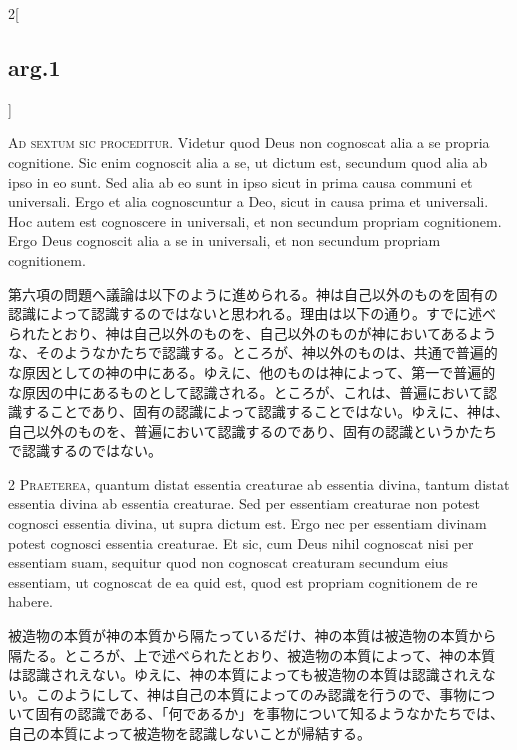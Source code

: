 \documentclass[paper=a4paper,fontsize=10pt,jafontsize=9pt,titlepage]{jlreq}
\begin{document}
\begin{paracol}{2}[\subsection{arg.1}]

{\huge A}{\scshape d sextum sic proceditur}. Videtur quod Deus non
cognoscat alia a se propria cognitione. Sic enim cognoscit alia a se,
ut dictum est, secundum quod alia ab ipso in eo sunt. Sed alia ab eo
sunt in ipso sicut in prima causa communi et universali. Ergo et alia
cognoscuntur a Deo, sicut in causa prima et universali. Hoc autem est
cognoscere in universali, et non secundum propriam cognitionem. Ergo
Deus cognoscit alia a se in universali, et non secundum propriam
cognitionem.

\switchcolumn

第六項の問題へ議論は以下のように進められる。神は自己以外のものを固有の
認識によって認識するのではないと思われる。理由は以下の通り。すでに述べ
られたとおり、神は自己以外のものを、自己以外のものが神においてあるよう
な、そのようなかたちで認識する。ところが、神以外のものは、共通で普遍的
な原因としての神の中にある。ゆえに、他のものは神によって、第一で普遍的
な原因の中にあるものとして認識される。ところが、これは、普遍において認
識することであり、固有の認識によって認識することではない。ゆえに、神は、
自己以外のものを、普遍において認識するのであり、固有の認識というかたち
で認識するのではない。


{\scshape 2 Praeterea}, quantum distat essentia creaturae ab essentia
divina, tantum distat essentia divina ab essentia creaturae. Sed per
essentiam creaturae non potest cognosci essentia divina, ut supra
dictum est. Ergo nec per essentiam divinam potest cognosci essentia
creaturae. Et sic, cum Deus nihil cognoscat nisi per essentiam suam,
sequitur quod non cognoscat creaturam secundum eius essentiam, ut
cognoscat de ea quid est, quod est propriam cognitionem de re habere.

\switchcolumn

被造物の本質が神の本質から隔たっているだけ、神の本質は被造物の本質から
隔たる。ところが、上で述べられたとおり、被造物の本質によって、神の本質
は認識されえない。ゆえに、神の本質によっても被造物の本質は認識されえな
い。このようにして、神は自己の本質によってのみ認識を行うので、事物につ
いて固有の認識である、「何であるか」を事物について知るようなかたちでは、
自己の本質によって被造物を認識しないことが帰結する。


\end{paracol}
\end{document}
